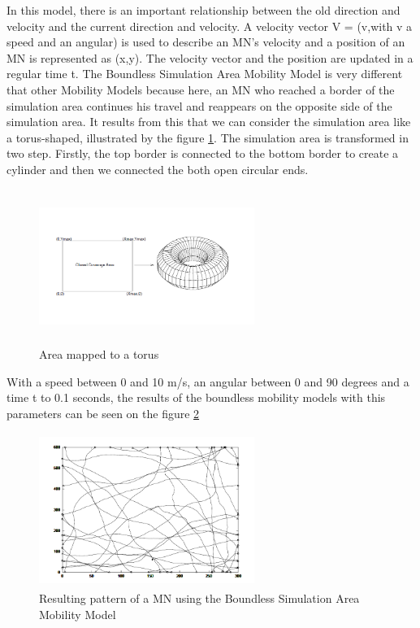 In this model, there is an important relationship between the old direction and velocity and the current direction and velocity. A velocity vector V = (v,\theta with v a speed and \theta an angular) is used to describe an MN's velocity and a position of an MN is represented as (x,y). The velocity vector and the position are updated in a regular time t. The Boundless Simulation Area Mobility Model is very different that other Mobility Models because here, an MN who reached a border of the simulation area continues his travel and reappears on the opposite side of the simulation area. It results from this that we can consider the simulation area like a torus-shaped, illustrated by the figure \ref{BoundlessFig}. The simulation area is transformed in two step. Firstly, the top border is connected to the bottom border to create a cylinder and then we connected the both open circular ends.

\begin{figure}[h]
\center
\includegraphics[width=7cm,height=50mm]{../images/boundlessmobilitymodel1.png}
\caption{\label{BoundlessFig}Area mapped to a torus}
\end{figure}


With a speed between 0 and 10 m/s, an angular between 0 and 90 degrees and a time t to 0.1 seconds, the results of the boundless mobility models with this parameters can be seen on the figure \ref{BoundlessFig2}

\begin{figure}[h]
\center
\includegraphics[width=7cm,height=50mm]{../images/boundlessmobilitymodel2.png}
\caption{\label{BoundlessFig2}Resulting pattern of a MN using the Boundless Simulation Area Mobility Model}
\end{figure}

